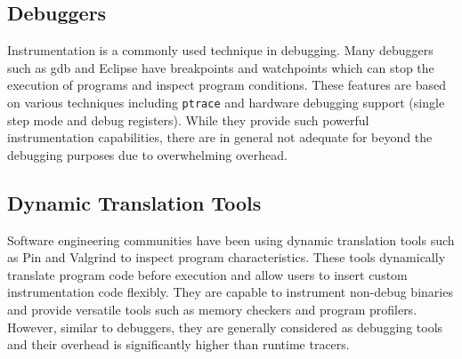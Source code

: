 
\subsection{Debuggers}
Instrumentation is a commonly used technique in debugging. Many debuggers such as gdb \cite{gdb} and Eclipse have breakpoints and watchpoints which can stop the execution of programs and inspect program conditions. These features are based on various techniques including \texttt{ptrace} and hardware debugging support (single step mode and debug registers). While they provide such powerful instrumentation capabilities, there are in general not adequate for beyond the debugging purposes due to overwhelming overhead.

\subsection{Dynamic Translation Tools}
Software engineering communities have been using dynamic translation tools such as Pin \cite{pin} and Valgrind \cite{valgrind} to inspect program characteristics. 
These tools dynamically translate program code before execution and allow users to insert custom instrumentation code flexibly. They are capable to instrument non-debug binaries and provide versatile tools such as memory checkers and program profilers. However, similar to debuggers, they are generally considered as debugging tools and their overhead is significantly higher than runtime tracers.


